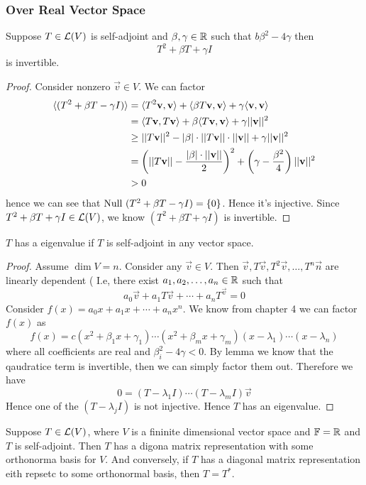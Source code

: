 \subsubsection*{Over Real Vector Space}
\begin{lemma}
	Suppose $T \in \mathcal L(V)$ is self-adjoint and $\beta, \gamma \in \mathbb R$ such that $b\beta^2 - 4 \gamma$ then
	\[ T^2 + \beta T + \gamma I\] is invertible.
\end{lemma}
\begin{proof}
Consider nonzero $\vec v \in V$. We can factor 
	\begin{align*}
		\langle (T^2 + \beta T - \gamma I) \rangle &= \langle T^2 \mathbf v, \mathbf v \rangle + \langle \beta T \mathbf v, \mathbf v \rangle + \gamma \langle \mathbf v, \mathbf v\rangle \\
		&= \langle T\mathbf v, T\mathbf v \rangle + \beta \langle T\mathbf v, \mathbf v\rangle + \gamma||\mathbf v||^2 \\
		&\geq ||T\mathbf v||^2 - |\beta| \cdot ||T\mathbf v|| \cdot ||\mathbf v|| + \gamma||\mathbf v||^2  \\
		&= \left( ||T\mathbf v|| - \frac{|\beta| \cdot ||\mathbf v||}{2} \right)^2 + \left( \gamma - \frac{\beta^2}{4} \right)||\mathbf v||^2 \\
		&> 0
	\end{align*}
	hence we can see that $\text{Null } (T^2 + \beta T - \gamma I) = \left\{ 0 \right\}$. Hence it's injective. Since $T^2 + \beta T + \gamma I \in \mathcal L(V)$, we know $(T^2 + \beta T + \gamma I)$ is invertible. 
\end{proof}
\begin{theorem}
	$T$ has a eigenvalue if $T$ is self-adjoint in any vector space.
\end{theorem}
\begin{proof}
	Assume $\dim V = n$. Consider any $\vec v \in V$. Then $\vec v, T\vec v, T^2 \vec v, \ldots, T^n \vec n$ are linearly dependent ( I.e, there exist ${a}_1,{a}_2, \ldots, {a}_{n} \in \mathbb R$ such that 
	\[a_0 \vec v + a_1 T \vec v + \cdots + a_n T^\vec v = 0\]
	Consider $f(x) = a_0x + a_1x + \cdots + a_nx^n$. We know from chapter 4 we can factor $f(x)$ as 
	\[ f(x) = c(x^2 + \beta_1 x + \gamma_1) \cdots (x^2 + \beta_m x + \gamma_m) (x - \lambda_1) \cdots (x - \lambda_n)\]
	where all coefficients are real and $\beta_i^2 - 4 \gamma < 0$. By lemma we know that the qaudratice term is invertible, then we can simply factor them out. Therefore we have 
	\[ 0 = (T - \lambda_1 I) \cdots (T - \lambda_m I)\vec v\]
	Hence one of the $(T - \lambda_j I)$ is not injective. Hence $T$ has an eigenvalue.
\end{proof}
\begin{theorem}
	Suppose $T \in \mathcal L(V)$, where $V$ is a fininite dimensional vector space and $\mathbb F = \mathbb R$ and $T$ is self-adjoint. Then $T$ has a digona matrix representation with some orthonorma basis for $V$. And conversely, if $T$ has a diagonal matrix representation eith repsetc to some orthonormal basis, then $T = T^*$.
\end{theorem}
